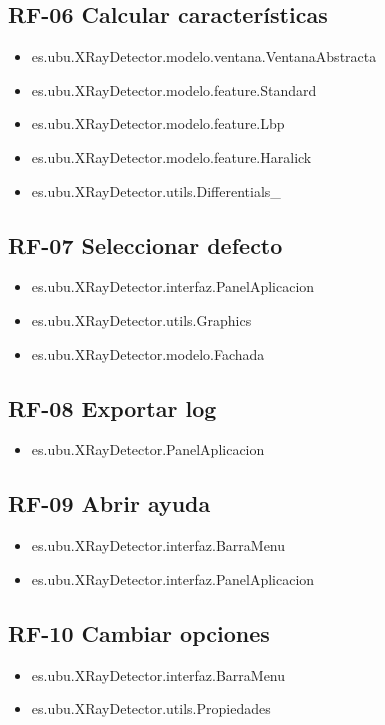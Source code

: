 \subsection{RF-06 Calcular características}
\begin{itemize}
\item[] es.ubu.XRayDetector.modelo.ventana.VentanaAbstracta
\item[] es.ubu.XRayDetector.modelo.feature.Standard
\item[] es.ubu.XRayDetector.modelo.feature.Lbp
\item[] es.ubu.XRayDetector.modelo.feature.Haralick
\item[] es.ubu.XRayDetector.utils.Differentials\_
\end{itemize}

\subsection{RF-07 Seleccionar defecto}
\begin{itemize}
\item[] es.ubu.XRayDetector.interfaz.PanelAplicacion
\item[] es.ubu.XRayDetector.utils.Graphics
\item[] es.ubu.XRayDetector.modelo.Fachada
\end{itemize}

\subsection{RF-08 Exportar log}
\begin{itemize}
\item[] es.ubu.XRayDetector.PanelAplicacion
\end{itemize}

\subsection{RF-09 Abrir ayuda}
\begin{itemize}
\item[] es.ubu.XRayDetector.interfaz.BarraMenu
\item[] es.ubu.XRayDetector.interfaz.PanelAplicacion
\end{itemize}

\subsection{RF-10 Cambiar opciones}
\begin{itemize}
\item[] es.ubu.XRayDetector.interfaz.BarraMenu
\item[] es.ubu.XRayDetector.utils.Propiedades
\end{itemize}

